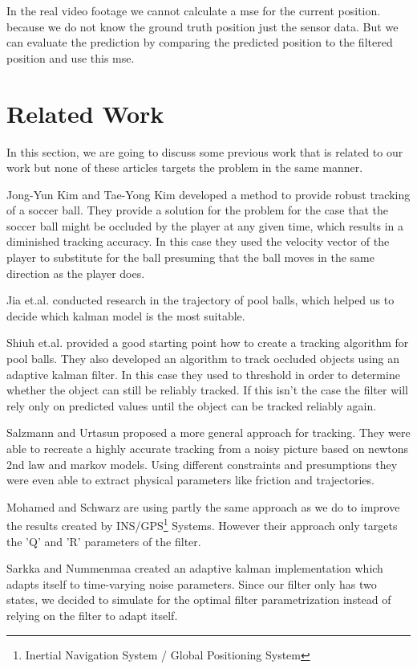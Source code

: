 \documentclass[titlepage, a4paper, 11pt]{scrartcl}
\begin{document}
In the real video footage we cannot calculate a mse for the current position. because we do not know the ground truth position just the sensor data.
But we can evaluate the prediction by comparing the predicted position to the filtered position and use this mse.

\section{Related Work}

In this section, we are going to discuss some previous work that is related to our work but none of these articles targets the problem in the same manner.

Jong-Yun Kim and Tae-Yong Kim \cite{kim} developed a method to provide robust tracking of a soccer ball. 
They provide a solution for the problem for the case that the soccer ball might be occluded by the player at any given time,
which results in a diminished tracking accuracy. 
In this case they used the velocity vector of the player to substitute for the ball presuming that the ball moves in the same direction as the player does.

Jia et.al. \cite{jia} conducted research in the trajectory of pool balls, which helped us to decide which kalman model is the most suitable.

Shiuh et.al. \cite{shiuh} provided a good starting point how to create a tracking algorithm for pool balls. They also developed an algorithm to track occluded objects using an adaptive kalman filter.
In this case they used to threshold in order to determine whether the object can still be reliably tracked. If this isn't the case the filter will rely only on predicted values until the object can be tracked reliably again.

Salzmann and Urtasun \cite{salzmann} proposed a more general approach for tracking. 
They were able to recreate a highly accurate tracking from a noisy picture based on newtons 2nd law and markov models.
Using different constraints and presumptions they were even able to extract physical parameters like friction and trajectories.

Mohamed and Schwarz \cite{schwarz} are using partly the same approach as we do to improve the results created by INS/GPS\footnote{Inertial Navigation System / Global Positioning System} Systems.
However their approach only targets the 'Q' and 'R' parameters of the filter.

Sarkka and Nummenmaa \cite{sarkka} created an adaptive kalman implementation which adapts itself to time-varying noise parameters. 
Since our filter only has two states, we decided to simulate for the optimal filter parametrization instead of relying on the filter to adapt itself.
\end{document}
